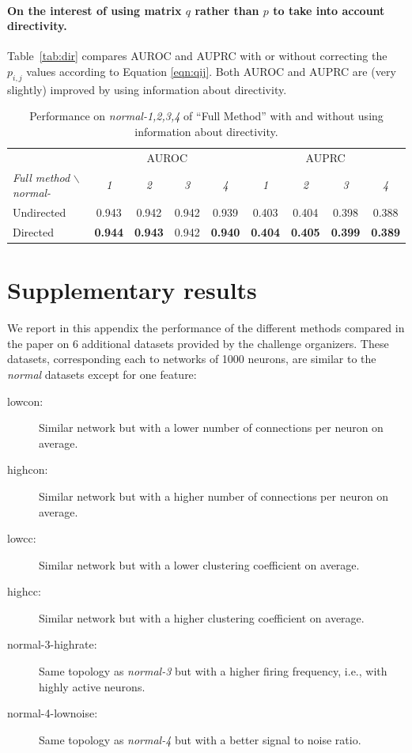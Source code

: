 \documentclass[wcp]{jmlr}
\begin{document}
\paragraph{On the interest of using matrix $q$ rather than $p$ to take into account directivity.}

Table~\ref{tab:dir} compares AUROC and AUPRC with or without correcting the $p_{i,j}$ values according to Equation \ref{eqn:qij}. Both AUROC and AUPRC are (very slightly) improved by using information about directivity.

\begin{table}[ht]\label{tab:dir}
\caption{Performance on \textit{normal-1,2,3,4} of ``Full Method'' with and
  without using information about directivity.}
\label{tab:directivity}
\centering
\small
\begin{tabular}{| l | c c c c | c c c c |}
\hline
& \multicolumn{4}{c|}{AUROC} & \multicolumn{4}{c|}{AUPRC} \\
\textit{Full method} $\backslash$ \textit{normal-} & \textit{1} & \textit{2} & \textit{3} & \textit{4} & \textit{1} & \textit{2} & \textit{3} & \textit{4} \\
\hline
\hline
 Undirected & 0.943 & 0.942 & 0.942 & 0.939 & 0.403 & 0.404 & 0.398 & 0.388  \\
  Directed & \textbf{0.944} & \textbf{0.943} & 0.942 & \textbf{0.940} & \textbf{0.404} & \textbf{0.405} & \textbf{0.399} & \textbf{0.389}\\
\hline
\end{tabular}
\end{table}


\section{Supplementary results} \label{app:supp}

We report in this appendix the performance of the different methods compared
in the paper on 6 additional datasets provided by the challenge
organizers. These datasets, corresponding each to networks of 1000 neurons, are similar to
the \textit{normal} datasets except for one feature:
\begin{description}
\item[lowcon:] Similar network but with a lower number of connections per neuron on average.
\item[highcon:] Similar network but with a higher number of connections per neuron on average.
\item[lowcc:] Similar network but with a lower clustering coefficient on average.
\item[highcc:] Similar network but with a higher clustering coefficient on average.
\item[normal-3-highrate:] Same topology as \textit{normal-3} but with a higher firing frequency, i.e., with highly active neurons.
\item[normal-4-lownoise:] Same topology as \textit{normal-4} but with a better signal to noise ratio.
\end{description}
\end{document}
